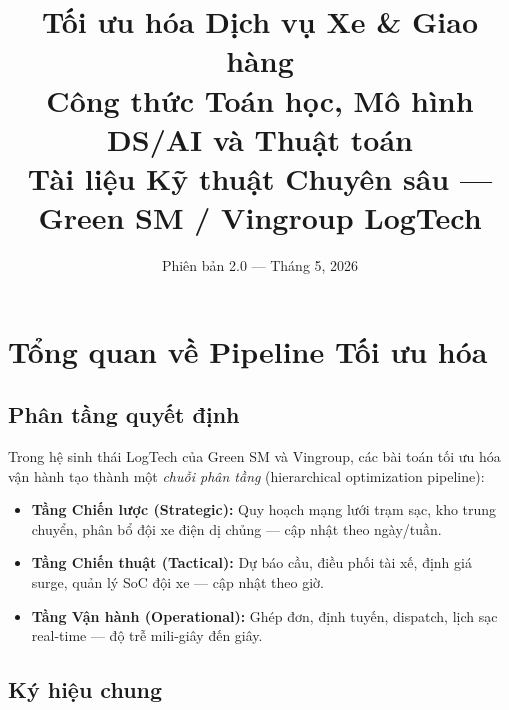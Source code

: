 \documentclass[12pt,a4paper]{article}
\title{
  \textbf{\Large Tối ưu hóa Dịch vụ Xe \& Giao hàng}\\[0.4em]
  \large Công thức Toán học, Mô hình DS/AI và Thuật toán\\[0.3em]
  \normalsize Tài liệu Kỹ thuật Chuyên sâu --- Green SM / Vingroup LogTech
}
\author{Phiên bản 2.0 --- Tháng 5, 2026}
\date{}
\begin{document}
\maketitle
\tableofcontents
\newpage

\section{Tổng quan về Pipeline Tối ưu hóa}

\subsection{Phân tầng quyết định}

Trong hệ sinh thái LogTech của Green SM và Vingroup, các bài toán tối ưu hóa
vận hành tạo thành một \emph{chuỗi phân tầng} (hierarchical optimization pipeline):

\begin{itemize}[leftmargin=2em, itemsep=4pt]
  \item \textbf{Tầng Chiến lược (Strategic):} Quy hoạch mạng lưới trạm sạc,
        kho trung chuyển, phân bổ đội xe điện dị chủng --- cập nhật theo ngày/tuần.
  \item \textbf{Tầng Chiến thuật (Tactical):} Dự báo cầu, điều phối tài xế,
        định giá surge, quản lý SoC đội xe --- cập nhật theo giờ.
  \item \textbf{Tầng Vận hành (Operational):} Ghép đơn, định tuyến, dispatch,
        lịch sạc real-time --- độ trễ mili-giây đến giây.
\end{itemize}

\subsection{Ký hiệu chung}
\end{document}
